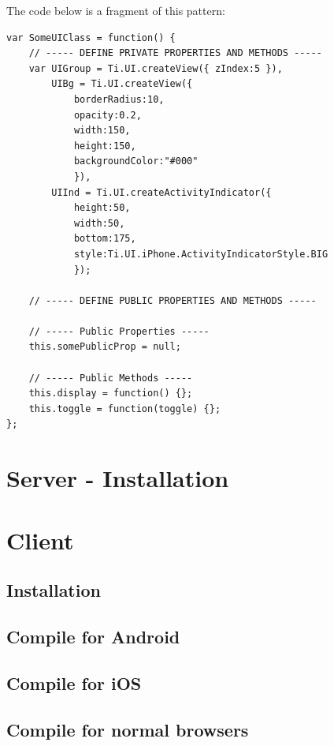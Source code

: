\documentclass[11pt]{book}
\begin{document}
The code below is a fragment of this pattern:
\begin{lstlisting}[frame=single]
var SomeUIClass = function() {
    // ----- DEFINE PRIVATE PROPERTIES AND METHODS -----
    var UIGroup = Ti.UI.createView({ zIndex:5 }),
        UIBg = Ti.UI.createView({
            borderRadius:10,
            opacity:0.2,
            width:150,
            height:150,
            backgroundColor:"#000" 
            }),
        UIInd = Ti.UI.createActivityIndicator({
            height:50,
            width:50,
            bottom:175,
            style:Ti.UI.iPhone.ActivityIndicatorStyle.BIG
            });

    // ----- DEFINE PUBLIC PROPERTIES AND METHODS -----

    // ----- Public Properties -----
    this.somePublicProp = null;

    // ----- Public Methods -----
    this.display = function() {};
    this.toggle = function(toggle) {};
};
\end{lstlisting}

\section{Server - Installation}
\section{Client}
\subsection{Installation}
\subsection{Compile for Android}
\subsection{Compile for iOS}
\subsection{Compile for normal browsers}
\end{document}

